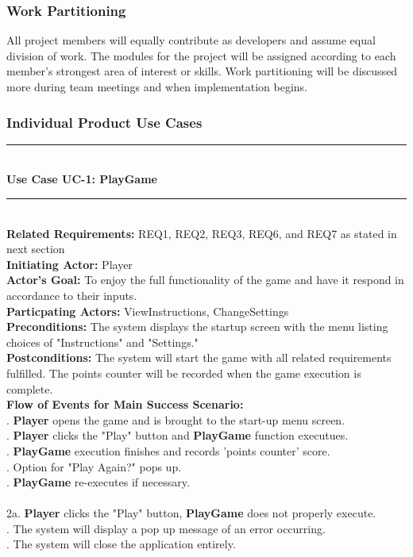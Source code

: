 \documentclass[12pt, titlepage]{article}
\begin{document}
\subsubsection{Work Partitioning}

All project members will equally contribute as developers and assume equal division of work. The modules for the project will be assigned according to each member's strongest area of interest or skills. Work partitioning will  be discussed more during team meetings and when implementation begins.

\subsubsection{Individual Product Use Cases}

\rule{400 pt}{1 pt}\\
{\bf Use Case UC-1: PlayGame}\\
\rule{400 pt}{1 pt}\\
{\bf Related Requirements:} REQ1, REQ2, REQ3, REQ6, and REQ7 as stated in next section \\
{\bf Initiating Actor:} Player \\
{\bf Actor's Goal:} To enjoy the full functionality of the game and have it respond in accordance to their inputs. \\
{\bf Particpating Actors:} ViewInstructions, ChangeSettings \\
{\bf Preconditions:} The system displays the startup screen with the menu listing choices of "Instructions" and "Settings." \\
{\bf Postconditions:} The system will start the game with all related requirements fulfilled. The points counter will be recorded when the game execution is complete. \\
{\bf Flow of Events for Main Success Scenario:} \\
. {\bf Player} opens the game and is brought to the start-up menu screen.\\
. {\bf Player} clicks the "Play" button and {\bf PlayGame} function executues.\\
. {\bf PlayGame} execution finishes and records 'points counter' score.\\
. Option for "Play Again?" pops up. \\
. {\bf PlayGame} re-executes if necessary.\\ 
 \\
2a. {\bf Player} clicks the "Play" button, {\bf PlayGame} does not properly execute.\\
. The system will display a pop up message of an error occurring. \\
. The system will close the application entirely.\\
\end{document}
